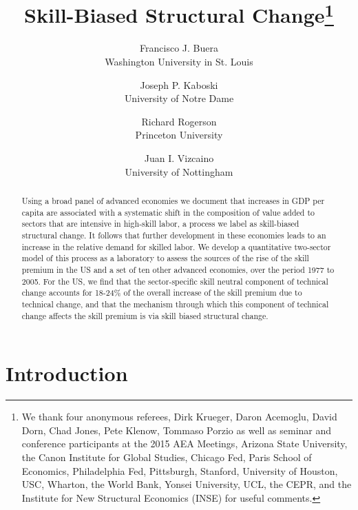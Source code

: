 \documentclass[12pt,english]{article}
\begin{document}
\title{Skill-Biased Structural Change\thanks{%
We thank four anonymous referees, Dirk Krueger, Daron Acemoglu, David Dorn,
Chad Jones, Pete Klenow, Tommaso Porzio as well as seminar and conference
participants at the 2015 AEA Meetings, Arizona State University, the Canon
Institute for Global Studies, Chicago Fed, Paris School of Economics,
Philadelphia Fed, Pittsburgh, Stanford, University of Houston, USC, Wharton,
the World Bank, Yonsei University, UCL, the CEPR, and the Institute for New
Structural Economics (INSE) for useful comments.}}
\author{Francisco J. Buera \\
Washington University in St. Louis \and Joseph P. Kaboski \\
University of Notre Dame \and Richard Rogerson \\
Princeton University \and Juan I. Vizcaino \\
University of Nottingham}
\maketitle

\begin{abstract}
Using a broad panel of advanced economies we document that increases in GDP
per capita are associated with a systematic shift in the composition of
value added to sectors that are intensive in high-skill labor, a process we
label as skill-biased structural change. It follows that further development
in these economies leads to an increase in the relative demand for skilled
labor. We develop a quantitative two-sector model of this process as a
laboratory to assess the sources of the rise of the skill premium in the US
and a set of ten other advanced economies, over the period 1977 to 2005. For
the US, we find that the sector-specific skill neutral component of
technical change accounts for 18-24\% of the overall increase of the skill
premium due to technical change, and that the mechanism through which this
component of technical change affects the skill premium is via skill biased
structural change.
\end{abstract}

\bigskip \newpage

\section{Introduction}
\end{document}
